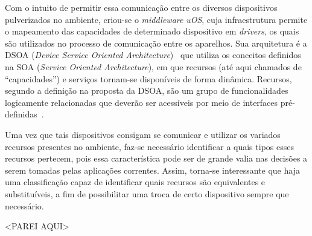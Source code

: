 Com o intuito de permitir essa comunicação entre os diversos dispositivos pulverizados no ambiente, criou-se o \emph{middleware} \emph{uOS}, cuja infraestrutura permite o mapeamento das capacidades de determinado dispositivo em \emph{drivers}, os quais são utilizados no processo de comunicação entre os aparelhos. Sua arquitetura é a DSOA (\emph{Device Service Oriented Architecture})~\cite{buzetoDSOA2010} que utiliza os conceitos definidos na SOA (\emph{Service Oriented Architecture}), em que recursos (até aqui chamados de ``capacidades'') e serviços tornam-se disponíveis de forma dinâmica. Recursos, segundo a definição na proposta da DSOA, são um grupo de funcionalidades logicamente relacionadas que deverão ser acessíveis por meio de interfaces pré-definidas~\cite{buzeto2010}. 

Uma vez que tais dispositivos consigam se comunicar e utilizar os variados recursos presentes no ambiente, faz-se necessário identificar a quais tipos esses recursos pertecem, pois essa característica pode ser de grande valia nas decisões a serem tomadas pelas aplicações correntes. Assim, torna-se interessante que haja uma classificação capaz de identificar quais recursos são equivalentes e substituíveis, a fim de possibilitar uma troca de certo dispositivo sempre que necessário.



<PAREI AQUI>

